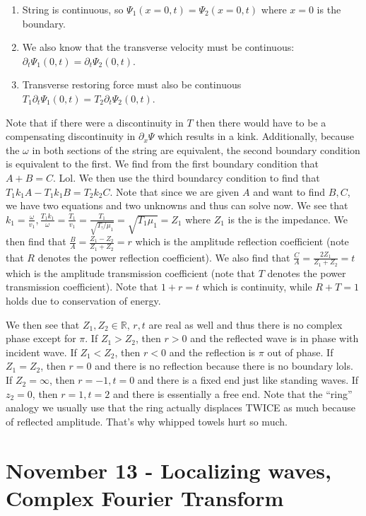 \documentclass{report}
\begin{document}
\begin{enumerate}
\item String is continuous, so $\Psi_1(x=0,t) = \Psi_2(x=0,t)$ where $x=0$ is the boundary. 
\item We also know that the transverse velocity must be continuous: $\partial_t\Psi_1(0,t) = \partial_t\Psi_2(0,t)$.
\item Transverse restoring force must also be continuous $T_1\partial_t\Psi_1(0,t) = T_2\partial_t\Psi_2(0,t)$. 
\end{enumerate}

Note that if there were a discontinuity in $T$ then there would have to be a compensating discontinuity in $\partial_x\Psi$ which results in a kink. Additionally, because the $\omega$ in both sections of the string are equivalent, the second boundary condition is equivalent to the first. We find from the first boundary condition that $A + B = C$. Lol. We then use the third boundarcy condition to find that $T_1k_1A - T_1k_1B = T_2k_2C$. Note that since we are given $A$ and want to find $B, C$, we have two equations and two unknowns and thus can solve now. We see that $k_1 = \frac{\omega}{v_1}, \frac{T_1k_1}{\omega} = \frac{T_1}{v_1} = \frac{T_1}{\sqrt{T_!/\mu_1}} = \sqrt{T_1\mu_1} = Z_1$ where $Z_1$ is the is the impedance. We then find that $\frac{B}{A} = \frac{Z_1 - Z_2}{Z_1 + Z_2} = r$ which is the amplitude reflection coefficient (note that $R$ denotes the power reflection coefficient). We also find that $\frac{C}{A} = \frac{2Z_1}{Z_1 + Z_2} = t$ which is the amplitude transmission coefficient (note that $T$ denotes the power transmission coefficient). Note that $1+r = t$ which is continuity, while $R + T = 1$ holds due to conservation of energy. 

We then see that $Z_1, Z_2 \in \mathbb{R}$, $r,t$ are real as well and thus there is no complex phase except for $\pi$. If $Z_1 > Z_2$, then $r > 0$ and the reflected wave is in phase with incident wave. If $Z_1 < Z_2$, then $r < 0$ and the reflection is $\pi$ out of phase. If $Z_1 = Z_2$, then $r = 0$ and there is no reflection because there is no boundary lols. If $Z_2 = \infty$, then $r = -1, t=0$ and there is a fixed end just like standing waves. If $z_2 = 0$, then $r=1, t=2$ and there is essentially a free end. Note that the ``ring'' analogy we usually use that the ring actually displaces TWICE as much because of reflected amplitude. That's why whipped towels hurt so much.

\chapter{November 13 - Localizing waves, Complex Fourier Transform}
\end{document}
